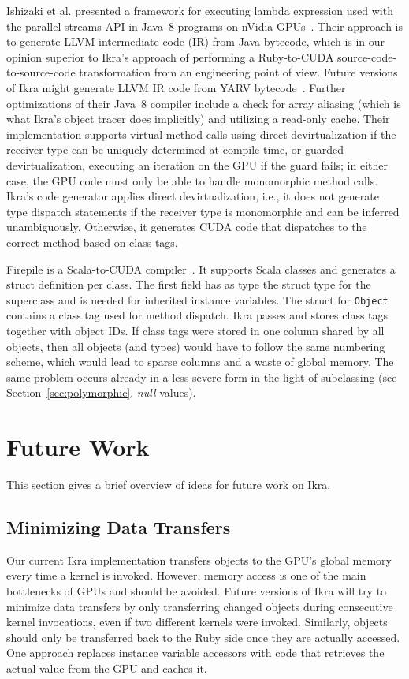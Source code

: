\documentclass[preprint]{sigplanconf}
\begin{document}
Ishizaki et al. presented a framework for executing lambda expression used with the parallel streams API in Java~8 programs on nVidia GPUs~\cite{ishizaki2015compiling}. Their approach is to generate LLVM intermediate code (IR) from Java bytecode, which is in our opinion superior to Ikra's approach of performing a Ruby-to-CUDA source-code-to-source-code transformation from an engineering point of view. Future versions of Ikra might generate LLVM IR code from YARV bytecode~\cite{Sasada:2005:YYR:1094855.1094912}. Further optimizations of their Java~8 compiler include a check for array aliasing (which is what Ikra's object tracer does implicitly) and utilizing a read-only cache. Their implementation supports virtual method calls using direct devirtualization if the receiver type can be uniquely determined at compile time, or guarded devirtualization, executing an iteration on the GPU if the guard fails; in either case, the GPU code must only be able to handle monomorphic method calls. Ikra's code generator applies direct devirtualization, i.e., it does not generate type dispatch statements if the receiver type is monomorphic and can be inferred unambiguously. Otherwise, it generates CUDA code that dispatches to the correct method based on class tags.

Firepile is a Scala-to-CUDA compiler~\cite{Nystrom:2011:FRC:2047862.2047883}. It supports Scala classes and generates a struct definition per class. The first field has as type the struct type for the superclass and is needed for inherited instance variables. The struct for \texttt{Object} contains a class tag used for method dispatch. Ikra passes and stores class tags together with object IDs. If class tags were stored in one column shared by all objects, then all objects (and types) would have to follow the same numbering scheme, which would lead to sparse columns and a waste of global memory. The same problem occurs already in a less severe form in the light of subclassing (see Section~\ref{sec:polymorphic}, \emph{null} values).

\section{Future Work}
This section gives a brief overview of ideas for future work on Ikra.

\subsection{Minimizing Data Transfers}
\label{sec:minimizing_dtr}
Our current Ikra implementation transfers objects to the GPU's global memory every time a kernel is invoked. However, memory access is one of the main bottlenecks of GPUs and should be avoided. Future versions of Ikra will try to minimize data transfers by only transferring changed objects during consecutive kernel invocations, even if two different kernels were invoked. Similarly, objects should only be transferred back to the Ruby side once they are actually accessed. One approach replaces instance variable accessors with code that retrieves the actual value from the GPU and caches it.
\end{document}
